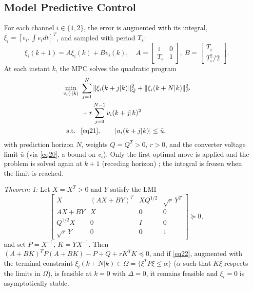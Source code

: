 \documentclass[conference]{IEEEtran}
\begin{document}
\subsection{Model Predictive Control}
For each channel $i\in\{1,2\}$, the error is augmented with its integral, $\xi_{i}=[e_{i},\int e_{i}dt]^{T}$, and sampled with period $T_{s}$:
\begin{equation}
\xi_{i}(k+1)=A\xi_{i}(k)+Bv_{i}(k),\quad A=\begin{bmatrix}1&0\\T_{s}&1\end{bmatrix}\!,\ B=\begin{bmatrix}T_{s}\\T_{s}^{2}/2\end{bmatrix}\!.
\label{eq21}
\end{equation}
At each instant $k$, the MPC solves the quadratic program
\begin{equation}
\begin{aligned}
\min_{v_{i}(\cdot|k)}\ & \sum_{j=1}^{N}\|\xi_{i}(k+j|k)\|_{Q}^{2}+\|\xi_{i}(k+N|k)\|_{P}^{2}\\
& +r\sum_{j=0}^{N-1}v_{i}(k+j|k)^{2}\\
\text{s.t. }\ & \eqref{eq21},\qquad |u_{i}(k+j|k)|\le\bar u ,
\end{aligned}
\label{eq22}
\end{equation}
with prediction horizon $N$, weights $Q=Q^{T}>0$, $r>0$, and the converter voltage limit $\bar u$ (via \eqref{eq20}, a bound on $v_{i}$). Only the first optimal move is applied and the problem is solved again at $k+1$ (receding horizon) \cite{b35}; the integral is frozen when the limit is reached.

\textit{Theorem 1:} Let $X=X^{T}>0$ and $Y$ satisfy the LMI
\begin{equation}
\begin{bmatrix}
X & (AX+BY)^{T} & XQ^{1/2} & \sqrt{r}\,Y^{T}\\
AX+BY & X & 0 & 0\\
Q^{1/2}X & 0 & I & 0\\
\sqrt{r}\,Y & 0 & 0 & 1
\end{bmatrix}\succeq0,
\label{eq23}
\end{equation}
and set $P=X^{-1}$, $K=YX^{-1}$. Then $(A+BK)^{T}P(A+BK)-P+Q+rK^{T}K\preceq0$, and if \eqref{eq22}, augmented with the terminal constraint $\xi_{i}(k+N|k)\in\Omega=\{\xi^{T}P\xi\le\alpha\}$ ($\alpha$ such that $K\xi$ respects the limits in $\Omega$), is feasible at $k=0$ with $\Delta=0$, it remains feasible and $\xi_{i}=0$ is asymptotically stable.
\end{document}
